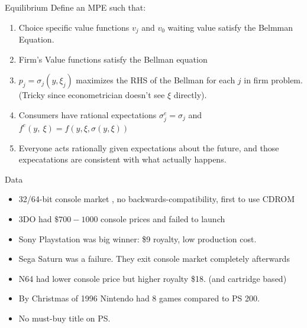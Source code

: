 \documentclass[xcolor=pdftex,dvipsnames,table,mathserif,aspectratio=169]{beamer}
\begin{document}
\begin{frame}{Equilibrium}
Define an MPE such that:
\begin{enumerate}
\item Choice specific value functions $v_j$ and $v_0$ waiting value satisfy the Belmman Equation.
\item Firm's Value functions satisfy the Bellman equation
\item $p_j = \sigma_j(y,\xi_j)$ maximizes the RHS of the Bellman for each $j$ in firm problem. (Tricky since econometrician doesn't see $\xi$ directly).
\item Consumers have rational expectations $\sigma^e_j = \sigma_j$ and $f^e(y,\
\xi) = f(y,\xi,\sigma(y,\xi))$ 
\item Everyone acts rationally given expectations about the future, and those expecatations are consistent with what actually happens.
\end{enumerate}
\end{frame}



\begin{frame}{Data}
\begin{itemize}
\item 32/64-bit console market , no backwards-compatibility, first to use CDROM
\item 3DO had $\$700-1000$ console prices and failed to launch
\item Sony Playstation was big winner: \$9 royalty, low production cost.
\item Sega Saturn was a failure. They exit console market completely afterwards
\item N64 had lower console price but higher royalty \$18. (and cartridge based)
\item By Christmas of 1996 Nintendo had 8 games compared to PS 200.
\item No must-buy title on PS.
\end{itemize}
\end{frame}
\end{document}
